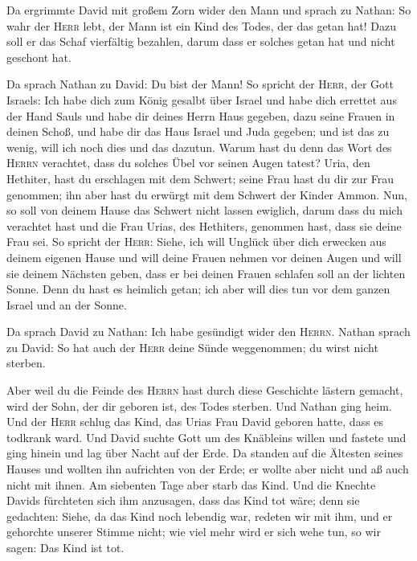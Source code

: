  Da ergrimmte David mit großem Zorn wider den Mann und
sprach zu Nathan: So wahr der \textsc{Herr} lebt, der Mann ist ein Kind
des Todes, der das getan hat!  Dazu soll er das Schaf
vierfältig bezahlen, darum dass er solches getan hat und nicht geschont
hat.

 Da sprach Nathan zu David: Du bist der Mann! So spricht
der \textsc{Herr}, der Gott Israels: Ich habe dich zum König gesalbt
über Israel und habe dich errettet aus der Hand Sauls  und
habe dir deines Herrn Haus gegeben, dazu seine Frauen in deinen Schoß,
und habe dir das Haus Israel und Juda gegeben; und ist das zu wenig,
will ich noch dies und das dazutun.  Warum hast du denn
das Wort des \textsc{Herrn} verachtet, dass du solches Übel vor seinen
Augen tatest? Uria, den Hethiter, hast du erschlagen mit dem Schwert;
seine Frau hast du dir zur Frau genommen; ihn aber hast du erwürgt mit
dem Schwert der Kinder Ammon.  Nun, so soll von deinem
Hause das Schwert nicht lassen ewiglich, darum dass du mich verachtet
hast und die Frau Urias, des Hethiters, genommen hast, dass sie deine
Frau sei.  So spricht der \textsc{Herr}: Siehe, ich will
Unglück über dich erwecken aus deinem eigenen Hause und will deine
Frauen nehmen vor deinen Augen und will sie deinem Nächsten geben, dass
er bei deinen Frauen schlafen soll an der lichten Sonne. 
Denn du hast es heimlich getan; ich aber will dies tun vor dem ganzen
Israel und an der Sonne.

 Da sprach David zu Nathan: Ich habe gesündigt wider den
\textsc{Herrn}. Nathan sprach zu David: So hat auch der \textsc{Herr}
deine Sünde weggenommen; du wirst nicht sterben.

 Aber weil du die Feinde des \textsc{Herrn} hast durch
diese Geschichte lästern gemacht, wird der Sohn, der dir geboren ist,
des Todes sterben.  Und Nathan ging heim. Und der
\textsc{Herr} schlug das Kind, das Urias Frau David geboren hatte, dass
es todkrank ward.  Und David suchte Gott um des Knäbleins
willen und fastete und ging hinein und lag über Nacht auf der Erde.
 Da standen auf die Ältesten seines Hauses und wollten
ihn aufrichten von der Erde; er wollte aber nicht und aß auch nicht mit
ihnen.  Am siebenten Tage aber starb das Kind. Und die
Knechte Davids fürchteten sich ihm anzusagen, dass das Kind tot wäre;
denn sie gedachten: Siehe, da das Kind noch lebendig war, redeten wir
mit ihm, und er gehorchte unserer Stimme nicht; wie viel mehr wird er
sich wehe tun, so wir sagen: Das Kind ist tot.

